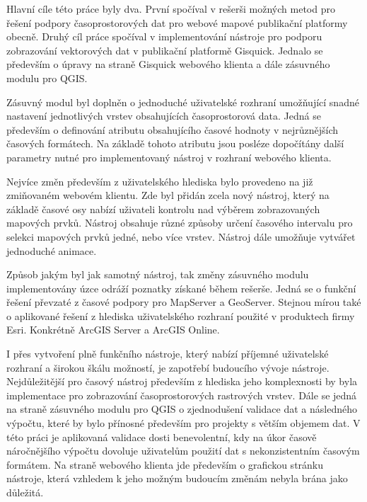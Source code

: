 \newpage
{}

Hlavní cíle této práce byly dva. První spočíval v rešerši možných
metod pro řešení podpory časoprostorových dat pro webové mapové
publikační platformy obecně. Druhý cíl práce spočíval v implementování
nástroje pro podporu zobrazování vektorových dat v publikační
platformě Gisquick. Jednalo se především o úpravy na straně Gisquick
webového klienta a dále zásuvného modulu pro QGIS.

Zásuvný modul byl doplněn o jednoduché uživatelské rozhraní umožňující
snadné nastavení jednotlivých vrstev obsahujících časoprostorová
data. Jedná se především o definování atributu obsahujícího časové
hodnoty v nejrůznějších časových formátech. Na základě tohoto atributu
jsou posléze dopočítány další parametry nutné pro implementovaný
nástroj v rozhraní webového klienta.

Nejvíce změn především z uživatelského hlediska bylo provedeno na již
zmiňovaném webovém klientu. Zde byl přidán zcela nový nástroj, který
na základě časové osy nabízí uživateli kontrolu nad výběrem
zobrazovaných mapových prvků. Nástroj obsahuje různé způsoby určení
časového intervalu pro selekci mapových prvků jedné, nebo více
vrstev. Nástroj dále umožňuje vytvářet jednoduché animace.

Způsob jakým byl jak samotný nástroj, tak změny zásuvného modulu
implementovány úzce odráží poznatky získané během rešerše. Jedná se o
funkční řešení převzaté z časové podpory pro MapServer a
GeoServer. Stejnou mírou také o aplikované řešení z hlediska
uživatelského rozhraní použité v produktech firmy Esri. Konkrétně
ArcGIS Server a ArcGIS Online.

I přes vytvoření plně funkčního nástroje, který nabízí příjemné
uživatelské rozhraní a širokou škálu možností, je zapotřebí budoucího
vývoje nástroje. Nejdůležitější pro časový nástroj především z
hlediska jeho komplexnosti by byla implementace pro zobrazování
časoprostorových rastrových vrstev. Dále se jedná na straně zásuvného modulu
pro QGIS o zjednodušení validace dat a následného výpočtu,
které by bylo přínosné především pro projekty s větším objemem dat. V
této práci je aplikovaná validace dosti benevolentní, kdy na úkor časově
náročnějšího výpočtu dovoluje uživatelům použití dat s nekonzistentním
časovým formátem. Na straně webového klienta jde především o grafickou
stránku nástroje, která vzhledem k jeho možným budoucím změnám nebyla
brána jako důležitá.

